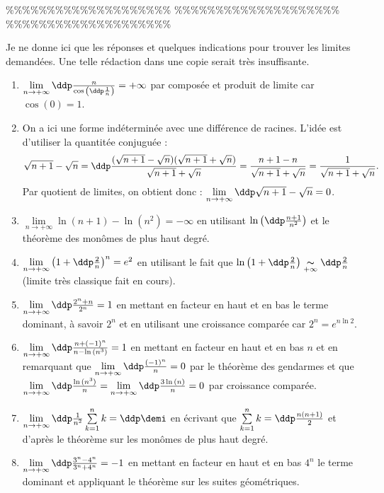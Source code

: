 \%\%\%\%\%\%\%\%\%\%\%\%\%\%\%\%\%\%\%\%
\%\%\%\%\%\%\%\%\%\%\%\%\%\%\%\%\%\%\%\%
\%\%\%\%\%\%\%\%\%\%\%\%\%\%\%\%\%\%\%\%




\begin{correction} \;
Je ne donne ici que les r\'eponses et quelques indications pour trouver les limites demand\'ees. Une telle r\'edaction dans une copie serait tr\`es insuffisante.
\begin{enumerate}
\item
$\lim \limits_{n\to +\infty}\ddp\frac{n}{\cos{\left(\ddp\frac{1}{n}  \right)}}=+\infty$ par compos\'ee et produit de limite car $\cos{(0)}=1$.
\item On a ici une forme ind\'etermin\'ee avec une diff\'erence de racines. L'id\'ee est d'utiliser la quantit\'ee conjugu\'ee :
$$\sqrt{n+1}-\sqrt{n} = \ddp \frac{(\sqrt{n+1}-\sqrt{n})(\sqrt{n+1}+\sqrt{n})}{\sqrt{n+1}+\sqrt{n}} = \frac{n+1-n}{\sqrt{n+1}+\sqrt{n}} = \frac{1}{\sqrt{n+1}+\sqrt{n}}.$$
Par quotient de limites, on obtient donc : $\lim \limits_{n\to +\infty}\ddp\sqrt{n+1}-\sqrt{n}=0$.
\item
$\lim \limits_{n\to +\infty}\ln{(n+1)}-\ln{(n^2)}=-\infty$ en utilisant $\ln{\left( \ddp\frac{n+1}{n^2} \right)}$ et le th\'eor\`{e}me des mon\^{o}mes de plus haut degr\'e.
\item
$\lim\limits_{n\to +\infty}\left(1+\ddp\frac{2}{n}\right)^n=e^2$ en utilisant le fait que $\ln{\left( 1+\ddp\frac{2}{n} \right)} \underset{+\infty}{\thicksim} \ddp\frac{2}{n}$ (limite tr\`{e}s classique fait en cours).
\item
$\lim \limits_{n\to +\infty}\ddp\frac{2^n+n}{2^n}=1$ en mettant en facteur en haut et en bas le terme dominant, \`a savoir $2^n$ et en utilisant une croissance compar\'ee car $2^n=e^{n\ln{2}}$. 
\item
$\lim \limits_{n\to +\infty}\ddp\frac{n+(-1)^n}{n-\ln{(n^3)}}=1$ en mettant en facteur en haut et en bas $n$ et en remarquant que $\lim\limits_{n\to +\infty} \ddp\frac{(-1)^n}{n}=0$ par le th\'eor\`eme des gendarmes et que $\lim\limits_{n\to +\infty} \ddp\frac{\ln{(n^3)}}{n}=\lim\limits_{n\to +\infty} \ddp\frac{3\ln{(n)}}{n}=0 $ par croissance compar\'ee.
\item
$\lim \limits_{n\to +\infty}\ddp\frac{1}{n^2}\sum\limits_{k=1}^n k= \ddp\demi$ en \'ecrivant que $\sum\limits_{k=1}^n k=\ddp\frac{n(n+1)}{2}$ et d'apr\`es le th\'eor\`eme sur les mon\^omes de plus haut degr\'e.
\item
$\lim \limits_{n\to +\infty}\ddp\frac{3^n-4^n}{3^n+4^n}=-1$ en mettant en facteur en haut et en bas $4^n$ le terme dominant et appliquant le th\'eor\`eme sur les suites g\'eom\'etriques.

\end{enumerate}
\end{correction}
